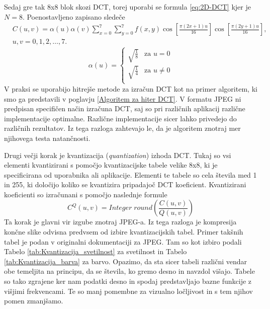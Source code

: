 \documentclass[a4paper,12pt,openright]{book}
\begin{document}
Sedaj gre tak 8x8 blok skozi DCT, torej uporabi se formula \ref{eq:2D-DCT} kjer je $N=8$. Poenostavljeno zapisano sledeče
\begin{equation}
    \begin{aligned}
    &C(u,v) = \alpha(u) \alpha(v) \sum_{x=0}^{7}\sum_{y=0}^{7} f(x,y)
    \cos\left[\frac{\pi(2x+1)u}{16}\right]
    \cos\left[\frac{\pi(2y+1)u}{16}\right], \\
    &u,v = 0,1,2,\ldots,7.
    \end{aligned}
\label{eq:2D-DCT_JPEG}
\end{equation}
\begin{equation}
\alpha(u)=
    \begin{cases}
          \sqrt{\frac{1}{8}} & \text{za $u=0$} \\
          \sqrt{\frac{1}{4}} & \text{za $u\neq 0$} \\
    \end{cases}
\label{eq:definicija_alpha_JPEG}
\end{equation}
V praksi se uporabijo hitrejše metode za izračun DCT kot na primer algoritem, ki smo ga predstavili v poglavju \ref{Algoritem za hiter DCT}. V formatu JPEG ni predpisan specifičen način izračuna DCT, saj so pri različnih aplikacij različne implementacije optimalne. Različne implementacije sicer lahko privedejo do različnih rezultatov. Iz tega razloga zahtevajo le, da je algoritem znotraj mer njihovega testa natančnosti. \par
Drugi večji korak je kvantizacija (\textit{quantization}) izhoda DCT. Tukaj so vsi elementi kvantizirani s pomočjo kvantizacijske tabele velike 8x8, ki je specificirana od uporabnika ali aplikacije. Elementi te tabele so cela števila med 1 in 255, ki določijo koliko se kvantizira pripadajoč DCT koeficient. Kvantizirani koeficienti so izračunani s pomočjo naslednje formule
\begin{equation}
C^Q(u,v) = Integer \; round \left(\frac{C(u,v)}{Q(u,v)} \right)
\label{eq:kvantizacija}
\end{equation}
Ta korak je glavni vir izgube znotraj JPEG-a. Iz tega razloga je kompresija končne slike odvisna predvsem od izbire kvantizacijskih tabel. Primer takšnih tabel je podan v originalni dokumentaciji za JPEG. Tam so kot izbiro podali Tabelo \ref{tab:Kvantizacija_svetilnost} za svetilnost in Tabelo \ref{tab:Kvantizacija_barva} za barvo. Opazimo, da sta sicer tabeli različni vendar obe temeljita na principu, da se števila, ko gremo desno in navzdol višajo. Tabele so tako zgrajene ker nam podatki desno in spodaj predstavljajo bazne funkcije z višjimi frekvencami. Te so manj pomembne za vizualno ločljivost in s tem njihov pomen zmanjšamo.
\end{document}
